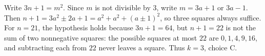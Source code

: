 Write $3n+1=m^2$. Since $m$ is not divisible by $3$, write $m=3a+1$ or $3a-1$. Then $n+1=3a^2\pm2a+1=a^2+a^2+(a\pm1)^2$, so three squares always suffice. For $n=21$, the hypothesis holds because $3n+1=64$, but $n+1=22$ is not the sum of two nonnegative squares: the possible squares at most $22$ are $0,1,4,9,16$, and subtracting each from $22$ never leaves a square. Thus $\boxed{k=3}$, choice C.
